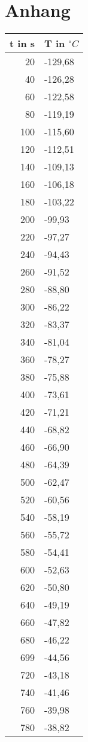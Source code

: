 \section{Anhang}
\nopagebreak
\begin{footnotesize}
\begin{table}[h]
\centering
\begin{tabular}{rl}
t in s & T in $^{\circ}C$\\
\toprule
20	&	-129,68\\
40	&	-126,28\\
60	&	-122,58\\
80	&	-119,19\\
100	&	-115,60\\
120	&	-112,51\\
140	&	-109,13\\
160	&	-106,18\\
180	&	-103,22\\
200	&	-99,93\\
220	&	-97,27\\
240	&	-94,43\\
260	&	-91,52\\
280	&	-88,80\\
300	&	-86,22\\
320	&	-83,37\\
340	&	-81,04\\
360	&	-78,27\\
380	&	-75,88\\
400	&	-73,61\\
420	&	-71,21\\
440	&	-68,82\\
460	&	-66,90\\
480	&	-64,39\\
500	&	-62,47\\
520	&	-60,56\\
540	&	-58,19\\
560	&	-55,72\\
580	&	-54,41\\
600	&	-52,63\\
620	&	-50,80\\
640	&	-49,19\\
660	&	-47,82\\
680	&	-46,22\\
699	&	-44,56\\
720	&	-43,18\\
740	&	-41,46\\
760	&	-39,98\\
780	&	-38,82\\

\end{tabular}
\end{table}
\end{footnotesize}
